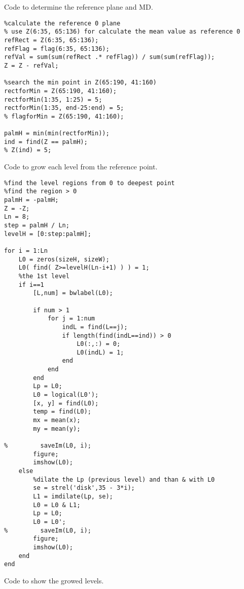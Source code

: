 Code to determine the reference plane and MD.

\begin{verbatim}
%calculate the reference 0 plane
% use Z(6:35, 65:136) for calculate the mean value as reference 0
refRect = Z(6:35, 65:136);
refFlag = flag(6:35, 65:136);
refVal = sum(sum(refRect .* refFlag)) / sum(sum(refFlag));
Z = Z - refVal;

%search the min point in Z(65:190, 41:160)
rectforMin = Z(65:190, 41:160);
rectforMin(1:35, 1:25) = 5;
rectforMin(1:35, end-25:end) = 5;
% flagforMin = Z(65:190, 41:160);

palmH = min(min(rectforMin));
ind = find(Z == palmH);
% Z(ind) = 5;
\end{verbatim}
\clearpage

Code to grow each level from the reference point.

\begin{verbatim}
%find the level regions from 0 to deepest point 
%find the region > 0
palmH = -palmH;
Z = -Z;
Ln = 8;
step = palmH / Ln;
levelH = [0:step:palmH];

for i = 1:Ln
    L0 = zeros(sizeH, sizeW);
    L0( find( Z>=levelH(Ln-i+1) ) ) = 1;
    %the 1st level
    if i==1
        [L,num] = bwlabel(L0);

        if num > 1
            for j = 1:num
                indL = find(L==j);
                if length(find(indL==ind)) > 0
                    L0(:,:) = 0;
                    L0(indL) = 1;
                end
            end
        end
        Lp = L0;
        L0 = logical(L0');  
        [x, y] = find(L0);
        temp = find(L0);
        mx = mean(x);
        my = mean(y);

%         saveIm(L0, i);
        figure;
        imshow(L0);
    else
        %dilate the Lp (previous level) and than & with L0
        se = strel('disk',35 - 3*i);  
        L1 = imdilate(Lp, se);
        L0 = L0 & L1;
        Lp = L0;
        L0 = L0';   
%         saveIm(L0, i);
        figure;
        imshow(L0);
    end    
end
\end{verbatim}
\clearpage


Code to show the growed levels.

